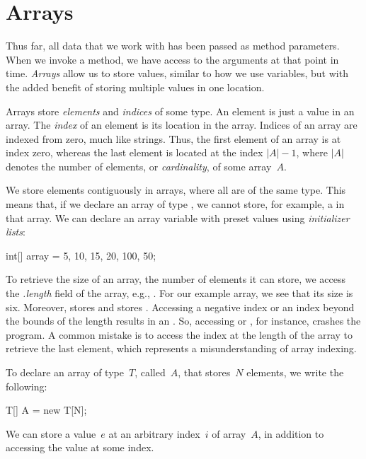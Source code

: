 \section{Arrays}

Thus far, all data that we work with has been passed as method parameters. 
When we invoke a method, we have access to the arguments at that point in time. 
\emph{Arrays} allow us to store values, similar to how we use variables, but with the added benefit of storing multiple values in one location.

Arrays store \emph{elements} and \emph{indices} of some type. 
An element is just a value in an array. 
The \emph{index} of an element is its location in the array. 
Indices of an array are indexed from zero, much like strings. 
Thus, the first element of an array is at index zero, whereas the last element is located at the index $|A| - 1$, where $|A|$ denotes the number of elements, or \emph{cardinality}, of some array~$A$.

We store elements contiguously in arrays, where all are of the same type. 
This means that, if we declare an array of type , we cannot store, for example, a  in that array. 
We can declare an array variable with preset values using \emph{initializer lists}:

\begin{verbnobox}[\small]
int[] array = {5, 10, 15, 20, 100, 50};
\end{verbnobox}

To retrieve the size of an array, the number of elements it can store, we access the \emph{.length} field of the array, e.g., . 
For our example array, we see that its size is six. 
Moreover,  stores  and  stores . 
Accessing a negative index or an index beyond the bounds of the length results in an . 
So, accessing  or , for instance, crashes the program. 
A common mistake is to access the index at the length of the array to retrieve the last element, which represents a misunderstanding of array indexing.

To declare an array of type~$T$, called~$A$, that stores~$N$ elements, we write the following:

\begin{verbnobox}[\small]
T[] A = new T[N];
\end{verbnobox}

We can store a value~$e$ at an arbitrary index~$i$ of array~$A$, in addition to accessing the value at some index.


